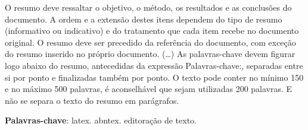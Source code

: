 \begin{resumo}
 O resumo deve ressaltar o objetivo, o método, os resultados e as conclusões  do documento. A ordem e a extensão  destes itens dependem do tipo de resumo (informativo ou indicativo) e do  tratamento que cada item recebe no documento original. O resumo deve ser  precedido da referência do documento, com exceção do resumo inserido no  próprio documento. (\ldots) As palavras-chave devem figurar logo abaixo do resumo, antecedidas da expressão Palavras-chave:, separadas entre si por ponto e finalizadas também por ponto. O texto pode conter no mínimo 150 e no máximo 500 palavras, é aconselhável que sejam utilizadas 200 palavras. E não se separa o texto do resumo em parágrafos.

 \vspace{\onelineskip}
    
 \noindent
 \textbf{Palavras-chave}: latex. abntex. editoração de texto.
\end{resumo}
